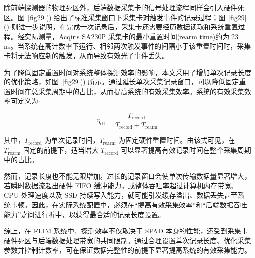 除前端探测器的物理死区外，后端数据采集卡的信号处理流程同样会引入硬件死区。图~\ref{fig29}() 给出了标准采集窗口下采集卡对触发事件的记录过程；图~\ref{fig29}() 则进一步说明，在完成一次记录后，采集卡还需要经历数据读取和系统重置过程。经实际测量，Acqiris SA230P 采集卡的最小重置时间(rearm time)约为 23\,ns。当系统在高计数率下运行、相邻两次触发事件的间隔小于该重置时间时，采集卡将无法响应新的触发，从而导致有效光子事件丢失。

为了降低固定重置时间对系统整体探测效率的影响，本文采用了增加单次记录长度的优化策略，如图~\ref{fig29}() 所示。通过延长单次采集记录窗口，可以降低固定重置时间在总采集周期中的占比，从而提高系统的有效采集效率。系统的有效采集效率可定义为:

\begin{equation}
  \eta_{\mathrm{eff}} = \frac{T_{\mathrm{record}}}{T_{\mathrm{record}} + T_{\mathrm{rearm}}}
\end{equation}

其中，$T_{\mathrm{record}}$ 为单次记录时间，$T_{\mathrm{rearm}}$ 为固定硬件重置时间。由该式可见，在 $T_{\mathrm{rearm}}$ 固定的前提下，适当增大 $T_{\mathrm{record}}$ 可以显著提高有效记录时间在整个采集周期中的占比。

然而，记录长度也不能无限增加。过长的记录窗口会使单次传输数据量显著增大，若瞬时数据流超出硬件 FIFO 缓冲能力，或整体吞吐率超过计算机内存带宽、CPU 处理速度以及 SSD 持续写入能力，就可能引发缓存溢出、数据丢失甚至系统卡顿。因此，在实际系统配置中，必须在``提高有效采集效率''和``后端数据吞吐能力''之间进行折中，以获得最合适的记录长度设置。

综上，在 FLIM 系统中，探测效率不仅取决于 SPAD 本身的性能，还受到采集卡硬件死区与后端数据处理带宽的共同限制。通过合理设置单次记录长度、优化采集参数并控制计数率，可在保证数据完整性的前提下显著提高系统的有效采集能力。


